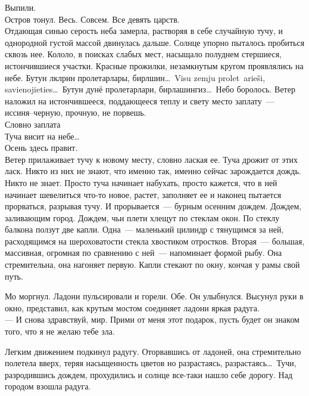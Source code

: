 \noindent Выпили.\\

\noindent Остров тонул. Весь. Совсем. Все девять царств.\\

Отдающая синью серость неба замерла, растворяя в себе случайную тучу, и 
однородной густой массой двинулась дальше. Солнце упорно пыталось пробиться 
сквозь нее. Кололо, в поисках слабых мест, насыщало полуднем стершиеся, 
истончившиеся участки. Красные прожилки, незамкнутым кругом проявлялись на 
небе. 
Бутун \cyrotld лк\cyrschwa л\cyrschwa рин пролетарлары, 
бирл\cyrschwa шин\ldots\ Visu zemju prolet~{a}rie\v{s}i,
savienojieties\ldots\ Бутун дунё пролетарлари, бирлашингиз\ldots\ Небо 
боролось. Ветер наложил на истончившееся, поддающееся теплу и свету место 
заплату~--- иссиня--черную, прочную, не порвешь.\\

\noindent Словно заплата\\

\noindent Туча висит на небе\ldots\\

\noindent Осень здесь правит.\\

Ветер прилаживает тучу к новому месту, словно лаская ее. Туча дрожит от этих 
ласк. Никто из них не знают, что именно так, именно сейчас зарождается дождь. 
Никто не знает. Просто туча начинает набухать, просто кажется, что в ней 
начинает шевелиться что-то новое, растет, заполняет ее и наконец пытается 
прорваться, разрывая тучу. И прорывается~--- бурным осенним дождем. Дождем, 
заливающим город. Дождем, чьи плети хлещут по стеклам окон. По стеклу балкона 
ползут две капли. Одна~--- маленький цилиндр с тянущимся за ней, расходящимся 
на шероховатости стекла хвостиком отростков. Вторая~--- большая, массивная, 
огромная по сравнению с ней~--- напоминает формой рыбу. Она стремительна, она 
нагоняет первую. Капли стекают по окну, кончая у рамы свой путь.

Мо моргнул. Ладони пульсировали и горели. Обе. Он улыбнулся. Высунул руки в 
окно, представил, как крутым мостом соединяет ладони яркая радуга.\\
--- И снова здравствуй, мир. Прими от меня этот подарок, пусть будет он знаком 
того, что я не желаю тебе зла.

Легким движением подкинул радугу. Оторвавшись от ладоней, она стремительно 
полетела вверх, теряя насыщенность цветов но разрастаясь, разрастаясь\ldots\ 
Тучи, разродившись дождем, прохудились и солнце все-таки нашло себе дорогу. Над 
городом взошла радуга.

